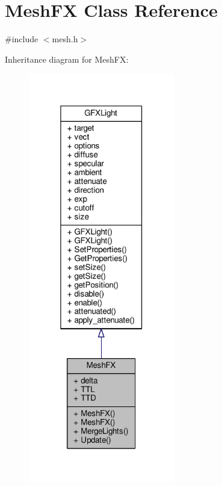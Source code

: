 \hypertarget{classMeshFX}{}\section{Mesh\+FX Class Reference}
\label{classMeshFX}


{\ttfamily \#include $<$mesh.\+h$>$}



Inheritance diagram for Mesh\+FX\+:
\nopagebreak
\begin{figure}[H]
\begin{center}
\leavevmode
\includegraphics[width=181pt]{da/dc6/classMeshFX__inherit__graph}
\end{center}
\end{figure}


